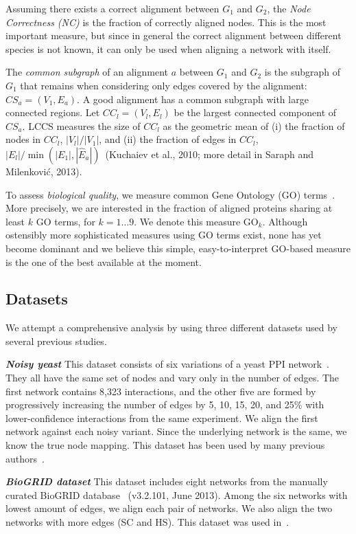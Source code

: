 \documentclass{bioinfo}
\newcommand{\Eb}{\hat{E}}
\begin{document}
Assuming there exists a correct alignment between $G_1$ and $G_2$, the {\it Node Correctness (NC)} is the fraction of correctly aligned nodes. This is the most important measure, but since in general the correct alignment between different species is not known, it can only be used when aligning a network with itself.

The \textit{common subgraph} of an alignment $a$ between $G_1$ and $G_2$ is the subgraph of $G_1$ that remains when considering only edges covered by the alignment: $CS_a=(V_1,E_a)$. A good alignment has a common subgraph with large connected regions. Let $CC_l=(V_l,E_l)$ be the largest connected component of $CS_a$. LCCS measures the size of $CC_l$ as the geometric mean of (i) the fraction of nodes in $CC_l$, $|V_l|/|V_1|$, and (ii) the fraction of edges in $CC_l$, $|E_l|/\min(|E_1|,|\Eb_a|)$~(Kuchaiev et al., 2010; more detail in Saraph and Milenkovi\'{c}, 2013).

To assess {\it biological quality}, we measure common Gene Ontology (GO) terms~\citep{GOterms}. More precisely, we are interested in the fraction of aligned proteins sharing at least $k$ GO terms, for $k=1\ldots 9$. We denote this measure $\mbox{GO}_k$. Although ostensibly more sophisticated measures using GO terms exist, none has yet become dominant and we believe this simple, easy-to-interpret GO-based measure is the one of the best available at the moment.

\subsection{Datasets}\label{datadescription}

We attempt a comprehensive analysis by using three different datasets used by several previous studies.

\emph{\textbf{Noisy yeast}} This dataset consists of six variations of a yeast PPI network~\citep{Collins01032007}. They all have the same set of nodes and vary only in the number of edges. The first network contains 8,323 interactions, and the other five are formed by progressively increasing the number of edges by 5, 10, 15, 20, and 25\% with lower-confidence interactions from the same experiment. We align the first network against each noisy variant. Since the underlying network is the same, we know the true node mapping. This dataset has been used by many previous authors~\citep{MAGNA,GHOST,WAVE,GREAT}.

\emph{\textbf{BioGRID dataset}} This dataset includes eight networks from the manually curated BioGRID database~\citep{Chatr-aryamontri01012013} (v3.2.101, June 2013). Among the six networks with lowest amount of edges, we align each pair of networks. We also align the two networks with more edges (SC and HS). This dataset was used in~\cite{LGRAAL}.
\end{document}
